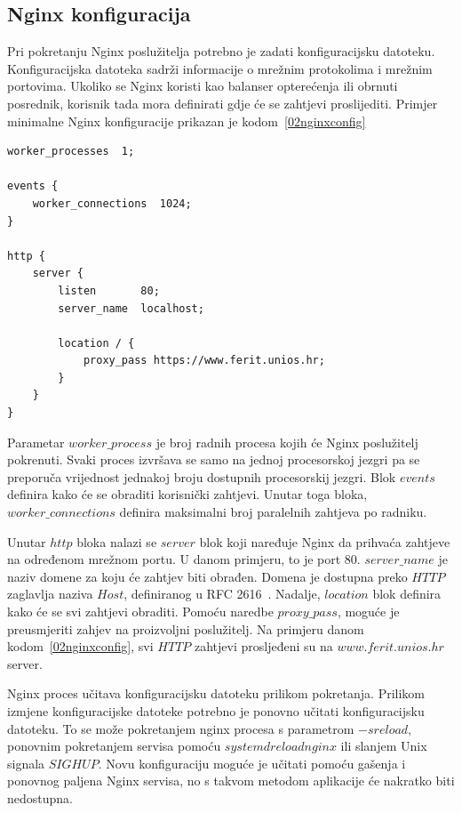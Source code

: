 \subsection{Nginx konfiguracija}
Pri pokretanju Nginx poslužitelja potrebno je zadati konfiguracijsku datoteku. Konfiguracijska
datoteka sadrži informacije o mrežnim protokolima i mrežnim portovima. Ukoliko se Nginx koristi kao
balanser opterećenja ili obrnuti posrednik, korisnik tada mora definirati gdje će se zahtjevi
proslijediti. Primjer minimalne Nginx konfiguracije prikazan je kodom~\ref{02nginxconfig}

\begin{lstlisting}[float=h]
worker_processes  1;

events {
    worker_connections  1024;
}

http {
    server {
        listen       80;
        server_name  localhost;

        location / {
            proxy_pass https://www.ferit.unios.hr;
        }
    }
}
\end{lstlisting}

Parametar $worker\_process$ je broj radnih procesa kojih će Nginx poslužitelj pokrenuti. Svaki
proces izvršava se samo na jednoj procesorskoj jezgri pa se preporuča vrijednost jednakoj broju
dostupnih procesorskij jezgri. Blok $events$ definira kako će se obraditi korisnički zahtjevi.
Unutar toga bloka, $worker\_connections$ definira maksimalni broj paralelnih zahtjeva po radniku.

Unutar $http$ bloka nalazi se $server$ blok koji naređuje Nginx da prihvaća zahtjeve na određenom
mrežnom portu. U danom primjeru, to je port 80. $server\_name$ je naziv domene za koju će zahtjev
biti obrađen. Domena je dostupna preko $HTTP$ zaglavlja naziva $Host$, definiranog u RFC
2616~\citep{fielding1999hypertext}. Nadalje, $location$ blok definira kako će se svi zahtjevi
obraditi. Pomoću naredbe $proxy\_pass$, moguće je preusmjeriti zahjev na proizvoljni poslužitelj. Na
primjeru danom kodom~\ref{02nginxconfig}, svi $HTTP$ zahtjevi prosljeđeni su na $www.ferit.unios.hr$
server.

Nginx proces učitava konfiguracijsku datoteku prilikom pokretanja. Prilikom izmjene konfiguracijske
datoteke potrebno je ponovno učitati konfiguracijsku datoteku. To se može pokretanjem nginx procesa
s parametrom $-s reload$, ponovnim pokretanjem servisa pomoću $systemd reload nginx$ ili slanjem
Unix signala $SIGHUP$. Novu konfiguraciju moguće je učitati pomoću gašenja i ponovnog paljena Nginx
servisa, no s takvom metodom aplikacije će nakratko biti nedostupna.

